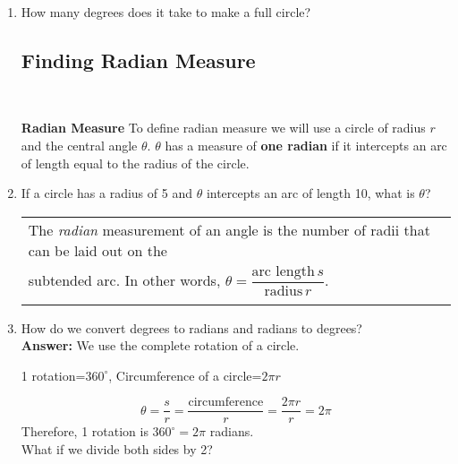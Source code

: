 \begin{enumerate}
\item How many degrees does it take to make a full circle?

  \vspace*{3em}


\clearpage

\subsection{Finding Radian Measure} ~

\textbf{Radian Measure} To define radian measure we will use a circle
of radius $r$ and the central angle $\theta$.  $\theta$ has a measure
of \textbf{one radian} if it intercepts an arc of length equal to the
radius of the circle.



\item If a circle has a radius of 5 and $\theta$ intercepts an arc of
  length 10, what is $\theta$?
  \vfill

\hspace{-.35in}
\begin{tabular}{ | l | } \hline
  The \emph{radian} measurement of an angle is the number of radii that can be laid out on the \\
  subtended arc. In other words, $\theta = \dfrac{\text{arc length}\, s}{\text{radius}\, r}$. \\
  \\ \hline
\end{tabular}
\clearpage

\item How do we convert degrees to radians and radians to degrees?\\
\textbf{Answer:}  We use the complete rotation of a circle.
\begin{center}
1 rotation=$360^\circ$, Circumference of a circle=$2\pi r$
\end{center}
$$\theta=\frac{s}{r}=\frac{\text{circumference}}{r}=\frac{2\pi r}{r}=2\pi$$
Therefore, 1 rotation is $360^\circ=2\pi$ radians.\\
What if we divide both sides by 2?\\[.2in]


\end{enumerate}
